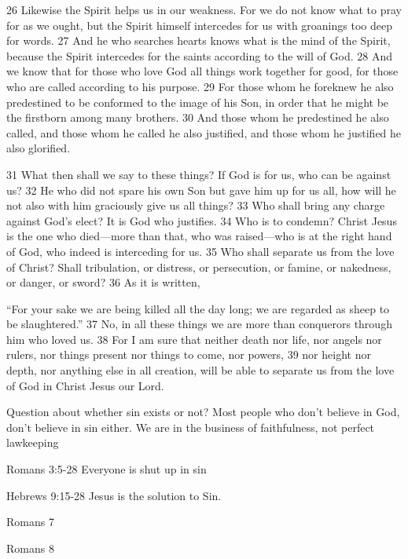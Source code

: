 \begin{bible}
26 Likewise the Spirit helps us in our weakness. For we do not know what to pray for as we ought, but the Spirit himself intercedes for us with groanings too deep for words. 27 And he who searches hearts knows what is the mind of the Spirit, because the Spirit intercedes for the saints according to the will of God. 28 And we know that for those who love God all things work together for good, for those who are called according to his purpose. 29 For those whom he foreknew he also predestined to be conformed to the image of his Son, in order that he might be the firstborn among many brothers. 30 And those whom he predestined he also called, and those whom he called he also justified, and those whom he justified he also glorified.

31 What then shall we say to these things? If God is for us, who can be against us? 32 He who did not spare his own Son but gave him up for us all, how will he not also with him graciously give us all things? 33 Who shall bring any charge against God's elect? It is God who justifies. 34 Who is to condemn? Christ Jesus is the one who died—more than that, who was raised—who is at the right hand of God, who indeed is interceding for us. 35 Who shall separate us from the love of Christ? Shall tribulation, or distress, or persecution, or famine, or nakedness, or danger, or sword? 36 As it is written,

``For your sake we are being killed all the day long;
    we are regarded as sheep to be slaughtered.''
37 No, in all these things we are more than conquerors through him who loved us. 38 For I am sure that neither death nor life, nor angels nor rulers, nor things present nor things to come, nor powers, 39 nor height nor depth, nor anything else in all creation, will be able to separate us from the love of God in Christ Jesus our Lord.

\end{bible}

\begin{discussion}
Question about whether sin exists or not? Most people who don't believe in God, don't believe in sin either.
We are in the business of faithfulness, not perfect lawkeeping


Romans 3:5-28 Everyone is shut up in sin

Hebrews 9:15-28 Jesus is the solution to Sin.


Romans 7


Romans 8

\end{discussion}